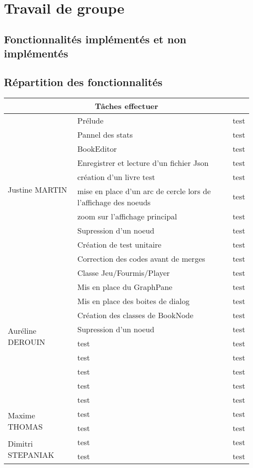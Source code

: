 \chapter{Travail de groupe}



	\section{Fonctionnalités implémentés et non implémentés}



	\section{Répartition des fonctionnalités}
	\begin{tabular}{|l|l l|}
		\hline
		\multicolumn{3}{|c|}{Tâches effectuer} \\
		\hline
		\multirow{10}{*}{Justine MARTIN}
			& Prélude & test \\
			& Pannel des stats & test \\
			& BookEditor & test \\
			& Enregistrer et lecture d'un fichier Json & test \\
			& création d'un livre test & test \\
			& mise en place d'un arc de cercle lors de l'affichage des noeuds & test \\
			& zoom sur l'affichage principal & test \\
			& Supression d'un noeud & test \\
			& Création de test unitaire & test \\
			& Correction des codes avant de merges & test \\\hline
		\multirow{10}{*}{Auréline DEROUIN}
			& Classe Jeu/Fourmis/Player & test \\
			& Mis en place du GraphPane & test \\
			& Mis en place des boites de dialog & test \\
			& Création des classes de BookNode & test \\
			& Supression d'un noeud & test \\
			& test & test \\
			& test & test \\
			& test & test \\
			& test & test \\
			& test & test \\ \hline
  		\multirow{2}{*}{Maxime THOMAS}
			& test & test \\
			& test & test \\ \hline
		\multirow{2}{*}{Dimitri STEPANIAK}
			& test & test \\
			& test & test \\\hline
		\end{tabular}
